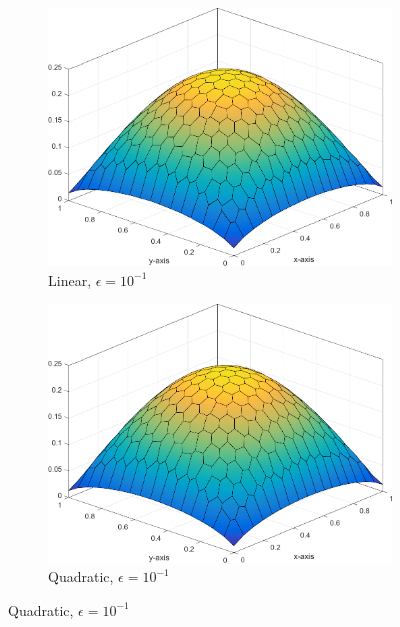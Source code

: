 \begin{figure}
\centering
{
	\begin{subfigure}[b]{0.465\textwidth}
		\centering
		\label{subfig::DL_trans_pwl1_e1}
		\includegraphics[width=\textwidth]{figures/sec_BF/Sq_poly_PWLD_k=1_ep=1e-1.png}
		\caption{Linear, $\epsilon = 10^{-1}$}
	\end{subfigure}
	\hfill
	\begin{subfigure}[b]{0.465\textwidth}
		\centering
		\label{subfig::DL_trans_pwl2_e1}
		\includegraphics[width=\textwidth]{figures/sec_BF/Sq_poly_PWLD_k=2_ep=1e-1.png}
		\caption{Quadratic, $\epsilon = 10^{-1}$}
	\end{subfigure}
}
{
	\vspace{3mm}
}
\end{figure}
